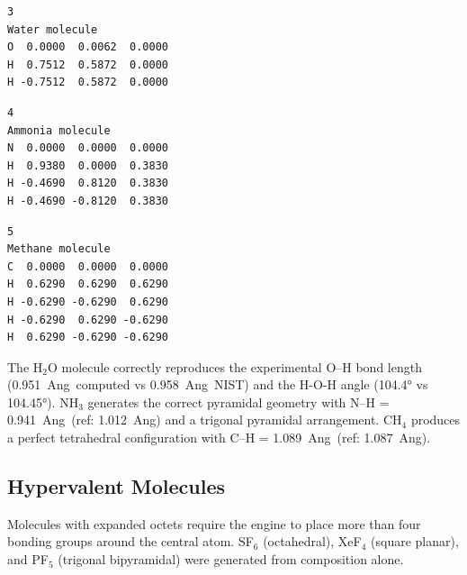 \documentclass[11pt,twoside]{article}
\def\AA{Ang}%
\begin{document}
\begin{minipage}[t]{0.30\textwidth}
\begin{lstlisting}[language={}, frame=single, basicstyle=\ttfamily\scriptsize, caption={\texttt{H2O.xyz}}]
3
Water molecule
O  0.0000  0.0062  0.0000
H  0.7512  0.5872  0.0000
H -0.7512  0.5872  0.0000
\end{lstlisting}
\end{minipage}
\hfill
\begin{minipage}[t]{0.30\textwidth}
\begin{lstlisting}[language={}, frame=single, basicstyle=\ttfamily\scriptsize, caption={\texttt{NH3.xyz}}]
4
Ammonia molecule
N  0.0000  0.0000  0.0000
H  0.9380  0.0000  0.3830
H -0.4690  0.8120  0.3830
H -0.4690 -0.8120  0.3830
\end{lstlisting}
\end{minipage}
\hfill
\begin{minipage}[t]{0.30\textwidth}
\begin{lstlisting}[language={}, frame=single, basicstyle=\ttfamily\scriptsize, caption={\texttt{CH4.xyz}}]
5
Methane molecule
C  0.0000  0.0000  0.0000
H  0.6290  0.6290  0.6290
H -0.6290 -0.6290  0.6290
H -0.6290  0.6290 -0.6290
H  0.6290 -0.6290 -0.6290
\end{lstlisting}
\end{minipage}

\vspace{0.5em}
The H$_2$O molecule correctly reproduces the experimental O--H bond length (0.951~\AA\ computed vs 0.958~\AA\ NIST) and the H-O-H angle (104.4° vs 104.45°). NH$_3$ generates the correct pyramidal geometry with N--H = 0.941~\AA\ (ref: 1.012~\AA) and a trigonal pyramidal arrangement. CH$_4$ produces a perfect tetrahedral configuration with C--H = 1.089~\AA\ (ref: 1.087~\AA).

\subsection{Hypervalent Molecules}

Molecules with expanded octets require the engine to place more than four bonding groups around the central atom. SF$_6$ (octahedral), XeF$_4$ (square planar), and PF$_5$ (trigonal bipyramidal) were generated from composition alone.
\end{document}
